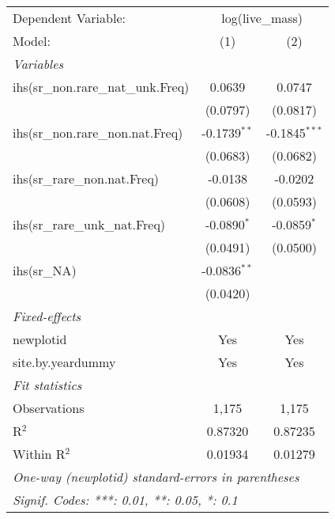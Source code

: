 \begin{tabular}{lcc}
\tabularnewline\midrule\midrule
Dependent Variable:&\multicolumn{2}{c}{log(live\_mass)}\\
Model:&(1) & (2)\\
\midrule \emph{Variables}&   &  \\
ihs(sr\_non.rare\_nat\_unk.Freq)&0.0639 & 0.0747\\
  &(0.0797) & (0.0817)\\
ihs(sr\_non.rare\_non.nat.Freq)&-0.1739$^{**}$ & -0.1845$^{***}$\\
  &(0.0683) & (0.0682)\\
ihs(sr\_rare\_non.nat.Freq)&-0.0138 & -0.0202\\
  &(0.0608) & (0.0593)\\
ihs(sr\_rare\_unk\_nat.Freq)&-0.0890$^{*}$ & -0.0859$^{*}$\\
  &(0.0491) & (0.0500)\\
ihs(sr\_NA)&-0.0836$^{**}$ &   \\
  &(0.0420) &   \\
\midrule \emph{Fixed-effects}&   &  \\
newplotid & Yes & Yes\\
site.by.yeardummy & Yes & Yes\\
\midrule \emph{Fit statistics}&  & \\
Observations & 1,175&1,175\\
R$^2$ & 0.87320&0.87235\\
Within R$^2$ & 0.01934&0.01279\\
\midrule\midrule\multicolumn{3}{l}{\emph{One-way (newplotid) standard-errors in parentheses}}\\
\multicolumn{3}{l}{\emph{Signif. Codes: ***: 0.01, **: 0.05, *: 0.1}}\\
\end{tabular}


